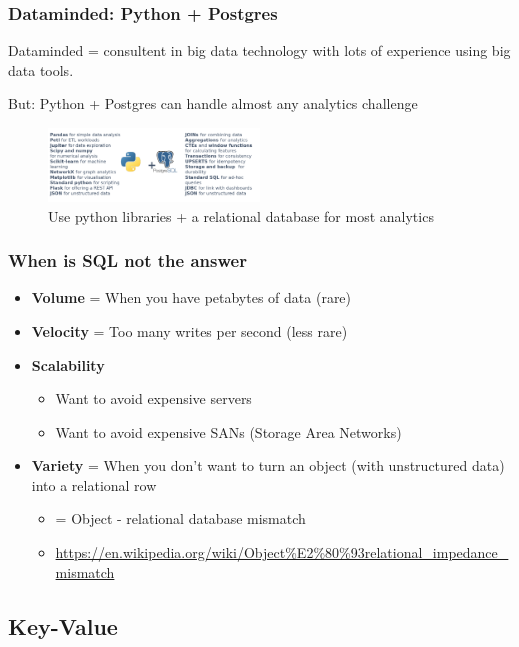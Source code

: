 \documentclass{article}
\begin{document}
\subsubsection{Dataminded: Python + Postgres}

Dataminded = consultent in big data technology with lots of experience using big data tools.

But: Python + Postgres can handle almost any analytics challenge

\begin{figure}[H]
    \centering
    \includegraphics[width=0.5\textwidth]{python-postgres.png}
    \caption{Use python libraries + a relational database for most analytics}
\end{figure}

\subsubsection{When is SQL not the answer}

\begin{itemize}
    \item \textbf{Volume} = When you have petabytes of data (rare)
    \item \textbf{Velocity} = Too many writes per second (less rare)
    \item \textbf{Scalability}
    \begin{itemize}
        \item Want to avoid expensive servers
        \item Want to avoid expensive SANs (Storage Area Networks)
    \end{itemize}
    \item \textbf{Variety} = When you don't want to turn an object (with unstructured data) into a relational row
    \begin{itemize}
        \item = Object - relational database mismatch
        \item \url{https://en.wikipedia.org/wiki/Object%E2%80%93relational_impedance_mismatch}
    \end{itemize}
\end{itemize}

\subsection{Key-Value}
\end{document}
